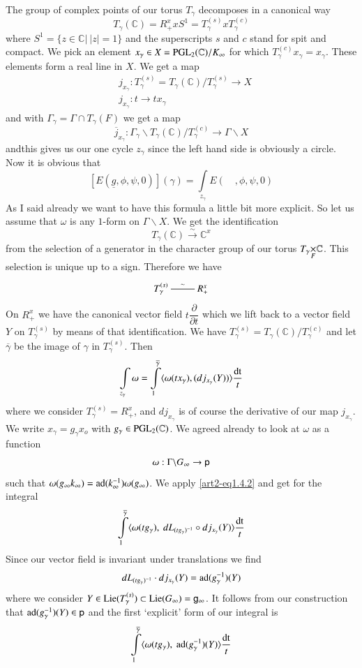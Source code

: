 The group of complex points of our torus $T_{\gamma}$ decomposes in a canonical way
$$
T_{\gamma}(\mathbb{C})=R^{x}_{+}xS^{1}=T^{(s)}_{\gamma}xT^{(c)}_{\gamma}
$$
where $S^{1}=\{z\in \mathbb{C}|~|z|=1\}$ and the superscripts $s$ and $c$ stand for spit and compact. We pick an element $x_{\gamma}\in X=\mathrm{PGL}_{2}(\mathbb{C})/K_{\infty}$ for which $T^{(c)}_{\gamma}x_{\gamma}=x_{\gamma}$. These elements form a real line in $X$. We get a map
\begin{align*}
& j_{x_{\gamma}}:T^{(s)}_{\gamma}=T_{\gamma}(\mathbb{C})/T^{(s)}_{\gamma}\to X\\
& j_{x_{\gamma}}:t\to tx_{\gamma}
\end{align*}
and with $\Gamma_{\gamma}=\Gamma\cap T_{\gamma}(F)$ we get a map
$$
\overline{j}_{x_{\gamma}}:\Gamma_{\gamma}\backslash T_{\gamma}(\mathbb{C})/T^{(c)}_{\gamma}\to \Gamma\backslash X
$$
and\pageoriginale this gives us our one cycle $z_{\gamma}$ since the left hand side is obviously a circle. Now it is obvious that
$$
[E(\underline{g},\phi,\psi,0)](\gamma)=\int\limits_{z_{\gamma}}E(\quad,\phi,\psi,0)
$$
As I said already we want to have this formula a little bit more explicit. So let us assume that $\omega$ is any $1$-form on $\Gamma\backslash X$. We get the identification
$$
T_{\gamma}(\mathbb{C})\xrightarrow{\sim}\mathbb{C}^{x}
$$
from the selection of a generator in the character group of our torus $\fprod{T_{\gamma}}{\mathbb{C}}{F}$. This selection is unique up to a sign. Therefore we have
\[
\xymatrix{
T^{(s)}_{\gamma}\ar@{-}[r]^-{\sim} & R^{x}_{+}
}
\]
On $R^{x}_{+}$ we have the canonical vector field $t\dfrac{\partial}{\partial t}$ which we lift back to a vector field $Y$ on $T^{(s)}_{\gamma}$ by means of that identification. We have $T^{(s)}_{\gamma}=T_{\gamma}(\mathbb{C})/T^{(c)}_{\gamma}$ and let $\overline{\gamma}$ be the image of $\gamma$ in $T^{(s)}_{\gamma}$. Then
$$
\int\limits_{z_{\gamma}}\omega=\int\limits^{\overline{\gamma}}_{1}\langle \omega(tx_{\gamma}),(dj_{x_{\gamma}}(Y))\rangle \dfrac{\operatorname{dt}}{t}
$$
where we consider $T^{(s)}_{\gamma}=R^{x}_{+}$, and $dj_{x_{\gamma}}$ is of course the derivative of our map $j_{x_{\gamma}}$. We write $x_{\gamma}=g_{\gamma}x_{o}$ with $g_{\gamma}\in \mathrm{PGL}_{2}(\mathbb{C})$. We agreed already to look at $\omega$ as a function
$$
\omega:\Gamma\backslash G_{\infty}\to\mathsf{p}
$$
such that $\omega(g_{\infty}k_{\infty})=\operatorname{ad}(k^{-1}_{\infty})\omega(g_{\infty})$. We apply \eqref{art2-eq1.4.2} and get for the integral
$$
\int\limits^{\overline{\gamma}}_{1}\langle \omega(tg_{\gamma}), \ dL_{(tg_{\gamma})^{-1}}\circ dj_{x_{\gamma}}(Y)\rangle \dfrac{\operatorname{dt}}{t}
$$
Since our vector field is invariant under translations we find
$$
dL_{(tg_{\gamma})^{-1}}\cdot dj_{x_{\gamma}}(Y)=\operatorname{ad}(g^{-1}_{\gamma})(Y)
$$
where we consider $Y\in \operatorname{Lie} (T^{(s)}_{\gamma})\subset \operatorname{Lie} (G_{\infty})=\mathsf{g}_{\infty}$. It follows from our construction that $\operatorname{ad}(g^{-1}_{\gamma})(Y)\in \mathsf{p}$ and the first `explicit' form of our integral is
\setcounter{equation}{0}
\begin{equation}
\int\limits^{\overline{\gamma}}_{1}\langle \omega(tg_{\gamma}), \ \operatorname{ad}(g^{-1}_{\gamma})(Y)\rangle \dfrac{\operatorname{dt}}{t}\label{art2-eq3.1.1}
\end{equation}

